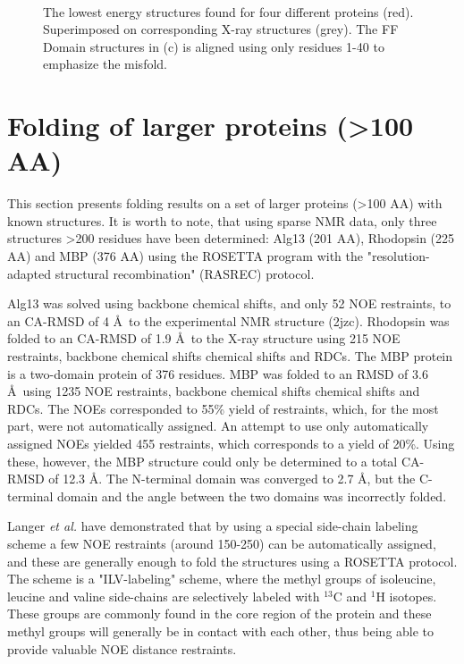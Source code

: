 \begin{figure}
{    }\\
    \caption{The lowest energy structures found for four different proteins (red). Superimposed on corresponding X-ray structures (grey). The FF Domain structures in (c) is aligned using only residues 1-40 to emphasize the misfold.}
    \label{fig:small_pics}%
\end{figure}



\clearpage

\section{Folding of larger proteins (\textgreater 100 AA)}

This section presents folding results on a set of larger proteins (\textgreater 100 AA) with known structures.
It is worth to note, that using sparse NMR data, only three structures \textgreater 200 residues have been determined: Alg13 (201 AA), Rhodopsin (225 AA) and MBP (376 AA) using the ROSETTA program with the "resolution-adapted structural recombination" (RASREC) protocol\cite{Lange2012,LangePNAS2012}.

Alg13 was solved using backbone chemical shifts, and only 52 NOE restraints, to an CA-RMSD of 4 \AA~to the experimental NMR structure (2jzc).
Rhodopsin was folded to an CA-RMSD of 1.9 \AA~to the X-ray structure using 215 NOE restraints, backbone chemical shifts chemical shifts and RDCs.
The MBP protein is a two-domain protein of 376 residues.
MBP was folded to an RMSD of 3.6 \AA~using 1235 NOE restraints, backbone chemical shifts chemical shifts and RDCs.
The NOEs corresponded to 55\% yield of restraints, which, for the most part,  were not automatically assigned.
An attempt to use only automatically assigned NOEs yielded 455 restraints, which corresponds to a yield of 20\%. Using these, however, the MBP structure could only be determined to a total CA-RMSD of 12.3 \AA.
The N-terminal domain was converged to 2.7 \AA, but the C-terminal domain and the angle between the two domains was incorrectly folded.

Langer \textit{et al.} have demonstrated that by using a special side-chain labeling scheme a few NOE restraints (around 150-250) can be automatically assigned, and these are generally enough to fold the structures using a ROSETTA protocol\cite{LangePNAS2012}.
The scheme is a "ILV-labeling" scheme, where the methyl groups of isoleucine, leucine and valine side-chains are selectively labeled with $^{13}$C and $^1$H isotopes. These groups are commonly found in the core region of the protein and these methyl groups will generally be in contact with each other, thus being able to provide valuable NOE distance restraints.

